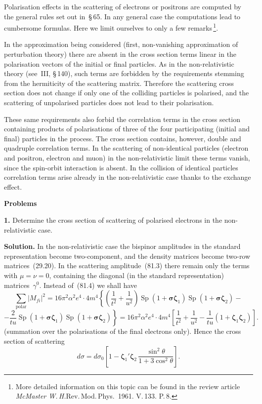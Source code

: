 Polarisation effects in the scattering of electrons or positrons are computed by the general rules set out in~\S\,65. In any general case the computations lead to cumbersome formulas. Here we limit ourselves to only a few remarks\,\footnote{More detailed information on this topic can be found in the review article \textit{McMaster W.\,H.}\/\!\/Rev.\,Mod.\,Phys.\ 1961. V.\,133. P.\,8.}.

In the approximation being considered (first, non-vanishing approximation of perturbation theory) there are absent in the cross section terms linear in the polarisation vectors of the initial or final particles. As in the non-relativistic theory (see~III, \S\,140), such terms are forbidden by the requirements stemming from the hermiticity of the scattering matrix. Therefore the scattering cross section does not change if only one of the colliding particles is polarised, and the scattering of unpolarised particles does not lead to their polarisation.

These same requirements also forbid the correlation terms in the cross section containing products of polarisations of three of the four participating (initial and final) particles in the process. The cross section contains, however, double and quadruple correlation terms. In the scattering of non-identical particles (electron and positron, electron and muon) in the non-relativistic limit these terms vanish, since the spin-orbit interaction is absent. In the collision of identical particles correlation terms arise already in the non-relativistic case thanks to the exchange effect.

\textbf{Problems}

\textbf{1.} Determine the cross section of scattering of polarised electrons in the non-relativistic case.

\textbf{Solution.} In the non-relativistic case the bispinor amplitudes in the standard representation become two-component, and the density matrices become two-row matrices~(29.20). In the scattering amplitude~(81.3) there remain only the terms with $\mu = \nu = 0$, containing the diagonal (in the standard representation) matrices~$\gamma^0$. Instead of~(81.4) we shall have
\[
\sum_{\text{polar}}|M_{fi}|^2 = 16\pi^2\alpha^2 e^4 \cdot 4m^4\left\{\left(\frac{1}{t^2} + \frac{1}{u^2}\right)\operatorname{Sp}(1+\boldsymbol{\sigma}\boldsymbol{\zeta}_1)\operatorname{Sp}(1+\boldsymbol{\sigma}\boldsymbol{\zeta}_2) -\right.
\]
\[
\left.- \frac{2}{tu}\operatorname{Sp}(1+\boldsymbol{\sigma}\boldsymbol{\zeta}_1)\operatorname{Sp}(1+\boldsymbol{\sigma}\boldsymbol{\zeta}_2)\right\} = 16\pi^2\alpha^2 e^4 \cdot 4m^4\left[\frac{1}{t^2}+\frac{1}{u^2} - \frac{1}{tu}(1+\boldsymbol{\zeta}_1\boldsymbol{\zeta}_2)\right].
\]
(summation over the polarisations of the final electrons only). Hence the cross section of scattering
\[
d\sigma = d\sigma_0\left[1 - \boldsymbol{\zeta}_1'\boldsymbol{\zeta}_2\,\frac{\sin^2\theta}{1+3\cos^2\theta}\right].
\]

